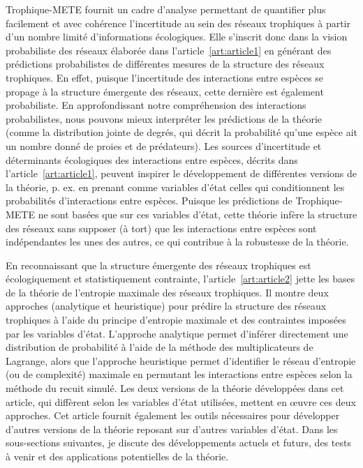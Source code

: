 Trophique-METE fournit un cadre d'analyse permettant de quantifier plus
facilement et avec cohérence l'incertitude au sein des réseaux trophiques à
partir d'un nombre limité d'informations écologiques. Elle s'inscrit donc dans
la vision probabiliste des réseaux élaborée dans l'article~\ref{art:article1} en
générant des prédictions probabilistes de différentes mesures de la structure
des réseaux trophiques. En effet, puisque l'incertitude des interactions entre
espèces se propage à la structure émergente des réseaux, cette dernière est
également probabiliste. En approfondissant notre compréhension des interactions
probabilistes, nous pouvons mieux interpréter les prédictions de la théorie
(comme la distribution jointe de degrés, qui décrit la probabilité qu'une espèce
ait un nombre donné de proies et de prédateurs). Les sources d'incertitude et
déterminants écologiques des interactions entre espèces, décrits dans
l'article~\ref{art:article1}, peuvent inspirer le développement de différentes
versions de la théorie, p. ex. en prenant comme variables d'état celles qui
conditionnent les probabilités d'interactions entre espèces. Puisque les
prédictions de Trophique-METE ne sont basées que sur ces variables d'état, cette
théorie infère la structure des réseaux sans supposer (à tort) que les
interactions entre espèces sont indépendantes les unes des autres, ce qui
contribue à la robustesse de la théorie.

En reconnaissant que la structure émergente des réseaux trophiques est
écologiquement et statistiquement contrainte, l'article~\ref{art:article2} jette
les bases de la théorie de l'entropie maximale des réseaux trophiques. Il montre
deux approches (analytique et heuristique) pour prédire la structure des réseaux
trophiques à l'aide du principe d'entropie maximale et des contraintes imposées
par les variables d'état. L'approche analytique permet d'inférer directement une
distribution de probabilité à l'aide de la méthode des multiplicateurs de
Lagrange, alors que l'approche heuristique permet d'identifier le réseau
d'entropie (ou de complexité) maximale en permutant les interactions entre
espèces selon la méthode du recuit simulé. Les deux versions de la théorie
développées dans cet article, qui diffèrent selon les variables d'état
utilisées, mettent en œuvre ces deux approches. Cet article fournit également
les outils nécessaires pour développer d'autres versions de la théorie reposant
sur d'autres variables d'état. Dans les sous-sections suivantes, je discute des
développements actuels et futurs, des tests à venir et des applications
potentielles de la théorie. 

